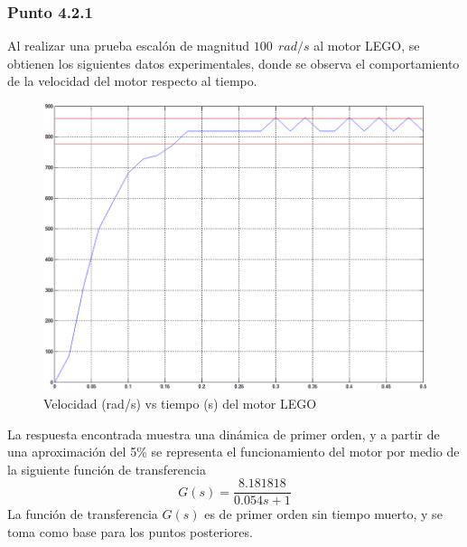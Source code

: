 \documentclass[twocolumn]{IEEEtran}
\begin{document}
\subsubsection{Punto 4.2.1}
\noindent
Al realizar una prueba escalón de magnitud $100\ \ rad/s$ al motor LEGO, se obtienen los siguientes datos experimentales, donde se observa el comportamiento de la velocidad del motor respecto al tiempo.
\begin{figure}[H]
	\centering
		\includegraphics[scale=0.27]{simulation1.png}
	\caption{Velocidad (rad/s) vs tiempo (s) del motor LEGO}
	\label{fig4}
\end{figure}
\noindent
La respuesta encontrada muestra una dinámica de primer orden, y a partir de una aproximación del 5\% se representa el funcionamiento del motor por medio de la siguiente función de transferencia
\begin{equation}
 G\left( s \right) = \frac{{8.181818}}{{0.054s + 1}}
\label{ecu7}
\end{equation}
\noindent
La función de transferencia $G(s)$ es de primer orden sin tiempo muerto, y se toma como base para los puntos posteriores.
\end{document}
